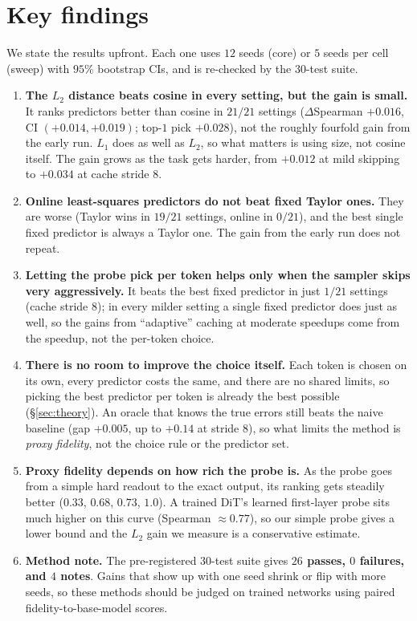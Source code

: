 \documentclass[10pt,twocolumn]{article}
\begin{document}
\section{Key findings}\label{sec:findings}
We state the results upfront. Each one uses $12$ seeds (core) or $5$ seeds per cell (sweep)
with $95\%$ bootstrap CIs, and is re-checked by the $30$-test suite.
\begin{enumerate}\setlength\itemsep{0.25ex}\leftskip-2pt
\item[\textbf{F1}] \textbf{The $L_2$ distance beats cosine in every setting, but the gain is
small.} It ranks predictors better than cosine in \textbf{$21/21$} settings ($\Delta$Spearman
$+0.016$, CI $(+0.014,+0.019)$; top-$1$ pick $+0.028$), not the roughly fourfold gain from
the early run. $L_1$ does as well as $L_2$, so what matters is using size, not cosine itself.
The gain grows as the task gets harder, from $+0.012$ at mild skipping to $+0.034$ at cache
stride $8$.
\item[\textbf{F2}] \textbf{Online least-squares predictors do not beat fixed Taylor ones.}
They are worse (Taylor wins in \textbf{$19/21$} settings, online in $0/21$), and the best
single fixed predictor is always a Taylor one. The gain from the early run does not repeat.
\item[\textbf{F3}] \textbf{Letting the probe pick per token helps only when the sampler
skips very aggressively.} It beats the best fixed predictor in just \textbf{$1/21$} settings
(cache stride $8$); in every milder setting a single fixed predictor does just as well, so
the gains from ``adaptive'' caching at moderate speedups come from the speedup, not the
per-token choice.
\item[\textbf{F4}] \textbf{There is no room to improve the choice itself.} Each token is
chosen on its own, every predictor costs the same, and there are no shared limits, so picking
the best predictor per token is already the best possible (\S\ref{sec:theory}). An oracle
that knows the true errors still beats the naive baseline (gap $+0.005$, up to $+0.14$ at
stride $8$), so what limits the method is \emph{proxy fidelity}, not the choice rule or the
predictor set.
\item[\textbf{F5}] \textbf{Proxy fidelity depends on how rich the probe is.} As the probe
goes from a simple hard readout to the exact output, its ranking gets steadily better
($0.33$, $0.68$, $0.73$, $1.0$). A trained DiT's learned first-layer probe sits much higher
on this curve (Spearman ${\approx}0.77$\cite{challagundla2025probe}), so our simple probe
gives a lower bound and the $L_2$ gain we measure is a conservative estimate.
\item[\textbf{F6}] \textbf{Method note.} The pre-registered $30$-test suite gives
\textbf{$26$ passes, $0$ failures, and $4$ notes}. Gains that show up with one seed shrink
or flip with more seeds, so these methods should be judged on trained networks using paired
fidelity-to-base-model scores.
\end{enumerate}
\end{document}

